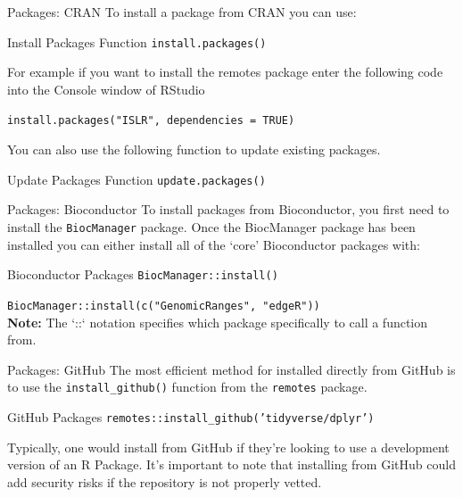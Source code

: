 \documentclass[aspectratio=169,xcolor=dvipsnames]{beamer}
\begin{document}
\begin{frame}{Packages: CRAN}
To install a package from CRAN you can use:

\begin{block}{Install Packages Function}
	\texttt{install.packages()}
\end{block}
 
 For example if you want to install the remotes package enter the following code into the Console window of RStudio \\
 \begin{center}
 \texttt{install.packages("ISLR", dependencies = TRUE)}
 \end{center}
You can also use the following function to update existing packages.
\begin{block}{Update Packages Function}
	\texttt{update.packages()}
\end{block}

\end{frame}


\begin{frame}{Packages: Bioconductor}
To install packages from Bioconductor, you first need to install the \texttt{BiocManager} package. Once the BiocManager package has been installed you can either install all of the ‘core’ Bioconductor packages with:
\begin{block}{Bioconductor Packages}
	\texttt{BiocManager::install()}
\end{block}
\texttt{BiocManager::install(c("GenomicRanges", "edgeR"))} \\
\vspace{0.75cm}
\textbf{Note:} The `::` notation specifies which package specifically to call a function from.

\end{frame}

\begin{frame}{Packages: GitHub}
The most efficient method for installed directly from GitHub is to use the \texttt{install\_github()} function from the \texttt{remotes} package.\\
\begin{block}{GitHub Packages}
	\texttt{remotes::install\_github('tidyverse/dplyr')}
    \end{block}

\vspace{0.25cm}
Typically, one would install from GitHub if they're looking to use a development version of an R Package. It's important to note that installing from GitHub could add security risks if the repository is not properly vetted.

\end{frame}
\end{document}

